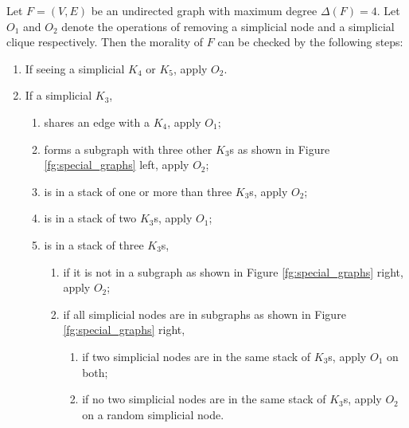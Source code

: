 \begin{theorem}
\label{thm:deg4}
Let $F=(V,E)$ be an undirected graph with maximum degree $\Delta(F)=4$. Let $O_1$ and $O_2$ denote the operations of removing a simplicial node and a simplicial clique respectively. Then the morality of $F$ can be checked by the following steps:
\begin{enumerate}
\item If seeing a simplicial $K_4$ or $K_5$, apply $O_2$.
\item If a simplicial $K_3$, 
\begin{enumerate}
\item shares an edge with a $K_4$, apply $O_1$;
\item forms a subgraph with three other $K_3$s as shown in Figure \ref{fg:special_graphs} left, apply $O_2$;
\item is in a stack of one or more than three $K_3$s, apply $O_2$;
\item is in a stack of two $K_3$s, apply $O_1$;
\item is in a stack of three $K_3$s, 
\begin{enumerate}
\item if it is not in a subgraph as shown in Figure \ref{fg:special_graphs} right, apply $O_2$;
\item if all simplicial nodes are in subgraphs as shown in Figure \ref{fg:special_graphs} right, 
\begin{enumerate}
\item if two simplicial nodes are in the same stack of $K_3$s, apply $O_1$ on both;
\item if no two simplicial nodes are in the same stack of $K_3$s, apply $O_2$ on a random simplicial node.  
\end{enumerate}
\end{enumerate}
\end{enumerate}
\end{enumerate}
\end{theorem}


